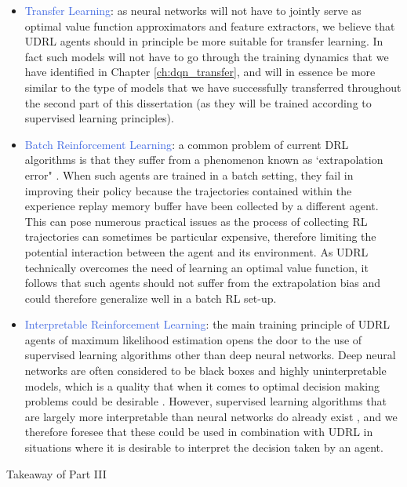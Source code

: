 \begin{itemize}
	\item \textcolor{RoyalBlue}{Transfer Learning}: as neural networks will not have to jointly serve as optimal value function approximators and feature extractors, we believe that UDRL agents should in principle be more suitable for transfer learning. In fact such models will not have to go through the training dynamics that we have identified in Chapter \ref{ch:dqn_transfer}, and will in essence be more similar to the type of models that we have successfully transferred throughout the second part of this dissertation (as they will be trained according to supervised learning principles).  
	\item \textcolor{RoyalBlue}{Batch Reinforcement Learning}: a common problem of current DRL algorithms is that they suffer from a phenomenon known as `extrapolation error" \cite{fujimoto2019benchmarking}. When such agents are trained in a batch setting, they fail in improving their policy because the trajectories contained within the experience replay memory buffer have been collected by a different agent. This can pose numerous practical issues as the process of collecting RL trajectories can sometimes be particular expensive, therefore limiting the potential interaction between the agent and its environment. As UDRL technically overcomes the need of learning an optimal value function, it follows that such agents should not suffer from the extrapolation bias and could therefore generalize well in a batch RL set-up.   
	\item \textcolor{RoyalBlue}{Interpretable Reinforcement Learning}: the main training principle of UDRL agents of maximum likelihood estimation opens the door to the use of supervised learning algorithms other than deep neural networks. Deep neural networks are often considered to be black boxes and highly uninterpretable models, which is a quality that when it comes to optimal decision making problems could be desirable \cite{mott2019towards}. However, supervised learning algorithms that are largely more interpretable than neural networks do already exist \cite{}, and we therefore foresee that these could be used in combination with UDRL in situations where it is desirable to interpret the decision taken by an agent.
\end{itemize}
  

\begin{takeaway}{Takeaway of Part III}

\end{takeaway}







